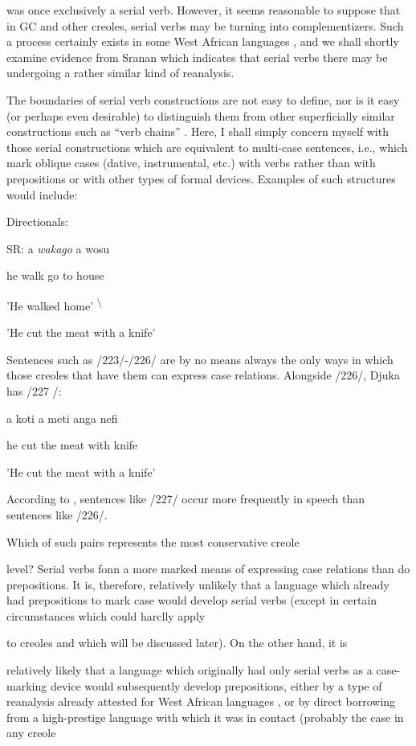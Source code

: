 was once exclusively a serial verb. However, it seems reasonable to suppose that in GC and other creoles, serial verbs may be turning into complementizers. Such a process certainly exists in some West African languages \citep{Lord1976}, and we shall shortly examine evidence from Sranan which indicates that serial verbs there may be undergoing a rather similar kind of reanalysis.

The boundaries of serial verb constructions are not easy to define, nor is it easy (or perhaps even desirable) to distinguish them from other superficially similar constructions such as ``verb chains'' \citep{Forman1972}. Here, I shall simply concern myself with those serial constructions which are equivalent to multi-case sentences, i.e., which mark oblique cases (dative, instrumental, etc.) with verbs rather than with prepositions or with other types of formal devices. Examples of such structures would include:

\ea\label{ex:223}
 Directionals:
\glt
\z

SR: a \textit{wak}\textit{a}\textit{go} a wosu

he walk go to house

'He walked home' \textsuperscript{{\textbackslash}}

'He cut the meat with a knife'

Sentences such as /223/-/226/ are by no means always the only ways in which those creoles that have them can express case relations. Alongside /226/, Djuka has /227 /:

\ea\label{ex:227}
 a koti a meti anga nefi
\glt
\z

he cut the meat with knife

'He cut the meat with a knife'

According to \citet{Huttar1975}, sentences like /227/ occur more fre\-quently in speech than sentences like /226/.

Which of such pairs represents the most conservative creole

level? Serial verbs fonn a more marked means of expressing case rela\-tions than do prepositions. It is, therefore, relatively unlikely that a language which already had prepositions to mark case would develop serial verbs (except in certain circumstances which could harclly apply

to creoles and which will be discussed later). On the other hand, it is

relatively likely that a language which originally had only serial verbs as a case-marking device would subsequently develop prepositions, either by a type of reanalysis already attested for West African lan\-guages \citep{Lord1976}, or by direct borrowing from a high-prestige lan\-guage with which it was in contact (probably the case in any creole

